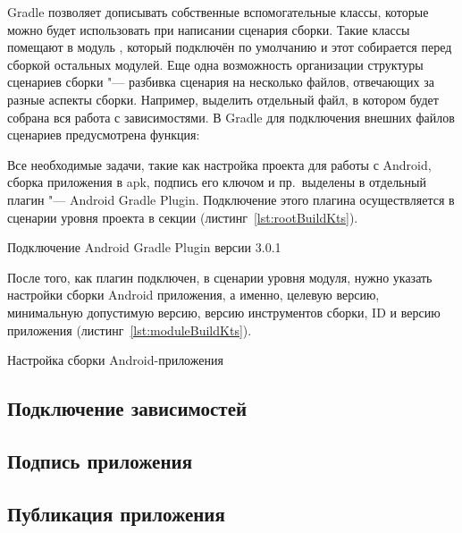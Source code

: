 Gradle позволяет дописывать собственные вспомогательные классы, которые можно будет использовать при написании сценария сборки.
Такие классы помещают в модуль , который подключён по умолчанию и этот собирается перед сборкой остальных модулей.
Еще одна возможность организации структуры сценариев сборки "--- разбивка сценария на несколько файлов, отвечающих за разные аспекты сборки.
Например, выделить отдельный файл, в котором будет собрана вся работа с зависимостями.
В Gradle для подключения внешних файлов сценариев предусмотрена функция:

Все необходимые задачи, такие как настройка проекта для работы с Android, сборка приложения в apk, подпись его ключом и пр.\ выделены в отдельный плагин "--- Android Gradle Plugin.
Подключение этого плагина осуществляется в сценарии уровня проекта в секции  (листинг~\ref{lst:rootBuildKts}).

\begin{listing}[H]
  \caption{Подключение Android Gradle Plugin версии 3.0.1}
  \label{lst:rootBuildKts}
\end{listing}

После того, как плагин подключен, в сценарии уровня модуля, нужно указать настройки сборки Android приложения, а именно, целевую версию, минимальную допустимую версию, версию инструментов сборки, ID и версию приложения (листинг~\ref{lst:moduleBuildKts}).

\begin{listing}[H]
  \caption{Настройка сборки Android-приложения}
  \label{lst:moduleBuildKts}
\end{listing}

\subsection{Подключение зависимостей}
\label{subsec:libs}

\subsection{Подпись приложения}
\label{subsec:signing}

\subsection{Публикация приложения}
\label{subsec:publish}

